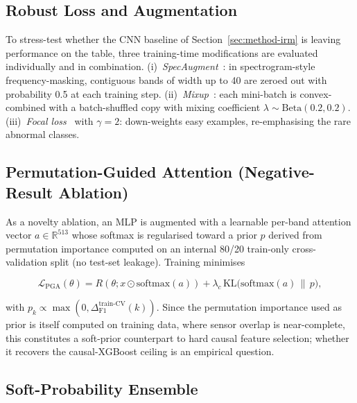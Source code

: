 \documentclass[sensors,article,submit,pdftex,oneauthor]{Definitions/mdpi}
\begin{document}
\subsection{Robust Loss and Augmentation}\label{sec:method-aug}

To stress-test whether the CNN baseline of
Section~\ref{sec:method-irm} is leaving performance on the
table, three training-time modifications are evaluated
individually and in combination.
(i)~\emph{SpecAugment}~\cite{park2019specaugment}: in
spectrogram-style frequency-masking, contiguous bands of width
up to 40 are zeroed out with probability 0.5 at each training
step. (ii)~\emph{Mixup}~\cite{zhang2018mixup}: each
mini-batch is convex-combined with a batch-shuffled copy with
mixing coefficient $\lambda \sim \mathrm{Beta}(0.2,0.2)$.
(iii)~\emph{Focal loss}~\cite{lin2017focal} with $\gamma = 2$:
down-weights easy examples, re-emphasising the rare abnormal
classes.

\subsection{Permutation-Guided Attention (Negative-Result
Ablation)}\label{sec:method-pga}

As a novelty ablation, an MLP is augmented with a learnable
per-band attention vector $a \in \mathbb{R}^{513}$ whose softmax
is regularised toward a prior $p$ derived from permutation
importance computed on an internal 80/20 train-only
cross-validation split (no test-set leakage). Training minimises

\begin{linenomath}
\begin{equation}
\mathcal{L}_{\mathrm{PGA}}(\theta)
= R(\theta; x \odot \mathrm{softmax}(a))
+ \lambda_c \,\mathrm{KL}\!\bigl(\mathrm{softmax}(a) \,\|\, p\bigr),
\end{equation}
\end{linenomath}

with $p_k \propto \max(0,
\Delta_{\mathrm{F1}}^{\text{train-CV}}(k))$. Since the
permutation importance used as prior is itself computed on
training data, where sensor overlap is near-complete, this
constitutes a soft-prior counterpart to hard causal feature
selection; whether it recovers the causal-XGBoost ceiling is an
empirical question.

\subsection{Soft-Probability Ensemble}\label{sec:method-ensemble}
\end{document}
